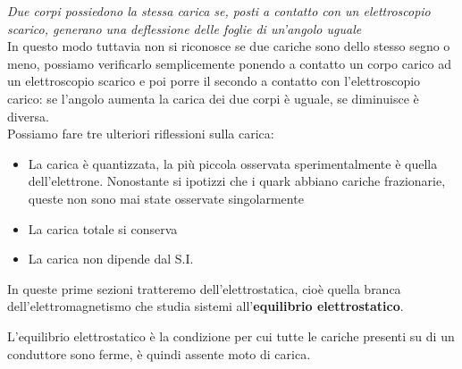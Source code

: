 \documentclass[
10pt, %
a4paper, %
oneside, %
headinclude,footinclude, %
BCOR5mm, %
]{scrartcl}
\begin{document}
\textit{Due corpi possiedono la stessa carica se, posti a contatto con un elettroscopio scarico, generano una deflessione delle foglie di un'angolo uguale}\\
In questo modo tuttavia non si riconosce se due cariche sono dello stesso segno o meno, possiamo verificarlo semplicemente ponendo a contatto un corpo carico ad un elettroscopio scarico e poi porre il secondo a contatto con l'elettroscopio carico: se l'angolo aumenta la carica dei due corpi è uguale, se diminuisce è diversa.\\
Possiamo fare tre ulteriori riflessioni sulla carica:
\begin{itemize}
	\item La carica è quantizzata, la più piccola osservata sperimentalmente è quella dell'elettrone. Nonostante si ipotizzi che i quark abbiano cariche frazionarie, queste non sono mai state osservate singolarmente
	\item La carica totale si conserva
	\item La carica non dipende dal S.I.
\end{itemize}
In queste prime sezioni tratteremo dell'elettrostatica, cioè quella branca dell'elettromagnetismo che studia sistemi all'\textbf{equilibrio elettrostatico}.
\begin{definizione}
	L'equilibrio elettrostatico è la condizione per cui tutte le cariche presenti su di un conduttore sono ferme, è quindi assente moto di carica.
\end{definizione}
\end{document}
